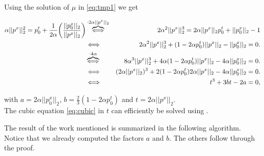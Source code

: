 \begin{enumerate}
        Using the solution of $\mu$ in \ref{eq:tmp1} we get

        \begin{eqnarray}
            \alpha ||p^{x}||_{2}^{2} = p_{0}^{t} + \frac{1}{2 \alpha} \bigg( \frac{||p_{0}^{x}||_{2}}{||p^{x}||_{2}} \bigg) &\overbrace{\Longleftrightarrow}^{\cdot 2 \alpha ||p^{x}||_{2}}& 2 \alpha^{2} ||p^{x}||_{2}^{3} = 2 \alpha ||p^{x}||_{2} p_{0}^{t} + ||p_{0}^{x}||_{2} - 1 \notag \\
            &\Longleftrightarrow& 2 \alpha^{2} ||p^{x}||_{2}^{3} + (1 - 2 \alpha p_{0}^{t}) ||p^{x}||_{2} - ||p_{0}^{x}||_{2} = 0. \notag \\ 
            &\overbrace{\Longleftrightarrow}^{\cdot 4 \alpha}& 8 \alpha^{3} ||p^{x}||_{2}^{3} + 4 \alpha (1 - 2 \alpha p_{0}^{t}) ||p^{x}||_{2} - 4 \alpha ||p_{0}^{x}||_{2} = 0. \notag \\
            &\Longleftrightarrow& (2 \alpha ||p^{x}||_{2})^{3} + 2 (1 - 2 \alpha p_{0}^{t}) 2 \alpha ||p^{x}||_{2} - 4 \alpha ||p_{0}^{x}||_{2} = 0. \notag \\
            &\Longleftrightarrow& t^{3} + 3bt - 2a = 0, \label{eq:cubic}
        \end{eqnarray}

        with $a = 2 \alpha ||p_{0}^{x}||_{2}$, $b = \frac{2}{3}(1 - 2 \alpha p_{0}^{t})$ and $t = 2 \alpha ||p^{x}||_{2}$.\\
        The cubic equation \ref{eq:cubic} in $t$ can efficiently be solved using \cite{kelvey-ajp}.

        \end{enumerate}

        The result of the work mentioned is summarized in the following algorithm. Notice that we already computed the factors $a$ and $b$. The others follow through the proof.



